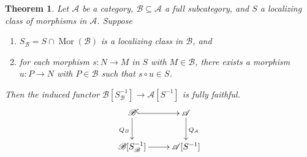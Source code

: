 \documentclass[11pt]{article}
\theoremstyle{thmstyle}
\newtheorem{theorem}{Theorem}[section]
\theoremstyle{defstyle}
\newcommand{\scrA}{\mathscr{A}}
\newcommand{\scrB}{\mathscr{B}}
\newcommand{\Mor}{\operatorname{Mor}}
\begin{document}
\begin{theorem}
	Let $\scrA$ be a category, $\scrB\subseteq\scrA$ a full subcategory, and $S$ a localizing class of morphisms in $\scrA$. Suppose 
	\begin{enumerate}[label=(\textbf{LS}\arabic*)]
		\item $S_{\scrB} = S\cap\Mor(\scrB)$ is a localizing class in $\scrB$, and \label{ls1}
		\item for each morphism $s\colon N\to M$ in $S$ with $M\in\scrB$, there exists a morphism $u\colon P\to N$ with $P\in\scrB$ such that $s\circ u\in S$.\label{ls2}
	\end{enumerate}
	Then the induced functor $\scrB[S_{\scrB}^{-1}]\to\scrA[S^{-1}]$ is fully faithful.
	\begin{equation*}
		\xymatrix {
			\scrB\ar@{^{(}->}[r]\ar[d]_{Q_B} & \scrA\ar[d]^{Q_A}\\
			\scrB[S_\scrB^{-1}]\ar[r] & \scrA[S^{-1}]
		}
	\end{equation*}
\end{theorem}
\end{document}

